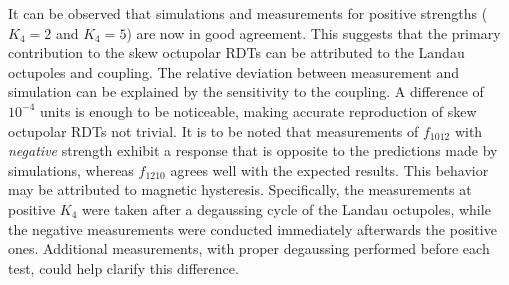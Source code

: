 It can be observed that simulations and measurements for positive strengths ($K_4=2$ and $K_4=5$) 
are now in good agreement. This suggests that the primary contribution to the skew octupolar RDTs
can be attributed to the Landau octupoles and coupling. The relative deviation between measurement
and simulation can be explained by the sensitivity to the coupling. A difference of $10^{-4}$ units 
is enough to be noticeable, making accurate reproduction of skew octupolar RDTs not trivial.
%
It is to be noted that measurements of $f_{1012}$ with \textit{negative} strength exhibit a
response that is opposite to the predictions made by simulations, whereas $f_{1210}$ agrees well
with the expected results. This behavior may be attributed to magnetic hysteresis. Specifically, the
measurements at positive $K_4$ were taken after a degaussing cycle of the Landau octupoles, while
the negative measurements were conducted immediately afterwards the positive ones. Additional
measurements, with proper degaussing performed before each test, could help clarify this difference.

